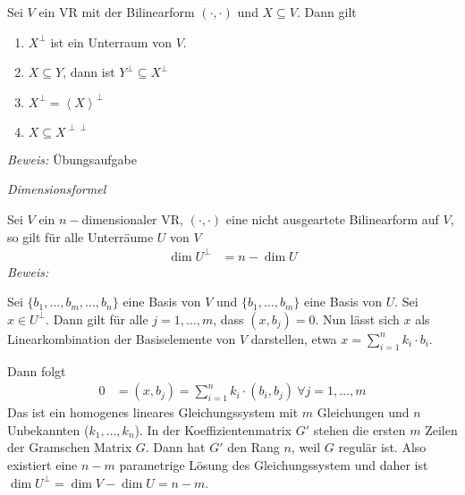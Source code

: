 
\begin{mysatz}\label{eigenschaftenorthKomplement}

Sei $V$ ein VR mit der Bilinearform $(\cdot , \cdot)$ und $X \subseteq V$.
Dann gilt
\begin{enumerate}
    \item $X^{\perp}$ ist ein Unterraum von $V$.
    \item $X \subseteq Y$, dann ist $Y^{\perp} \subseteq X^{\perp}$
    \item $X^{\perp} = \left\langle X \right\rangle^{\perp}$
    \item \label{EigOrthKompl4} $X \subseteq X^{\perp\perp}$
\end{enumerate}
\end{mysatz}
\textit{Beweis:} Übungsaufgabe


\begin{mylemma} \label{dimensionsformelorthKomplement} \textit{Dimensionsformel}

        Sei $V$ ein $n-$dimensionaler VR, $(\cdot , \cdot )$ eine nicht ausgeartete Bilinearform auf $V$, so gilt für alle Unterräume $U$ von $V$
        \begin{align*}
                \dim U^{\perp} & = n - \dim U
        \end{align*}
\textit{Beweis:}

        Sei $\{ b_1, \ldots, b_m, \ldots, b_n \}$ eine Basis von $V$ und $\{ b_1, \ldots, b_m \}$ eine Basis von $U$.
        Sei $x \in U^{\perp}$.
        Dann gilt für alle $j = 1, \ldots, m$, dass $(x, b_j) = 0$.
        Nun lässt sich $x$ als Linearkombination der Basiselemente von $V$ darstellen, etwa $\displaystyle{x=\sum_{i=1}^n k_i\cdot b_i}$.

        Dann folgt
        \begin{align*}
                0 & = (x, b_j) = \sum\limits_{i = 1}^n k_i \cdot (b_i, b_j) \ \forall j = 1, \ldots, m
        \end{align*}
        Das ist ein homogenes lineares Gleichungssystem mit $m$ Gleichungen und $n$ Unbekannten ($k_1, \ldots, k_n$).
        In der Koeffizientenmatrix $G'$ stehen die ersten $m$ Zeilen der Gramschen Matrix $G$.
        Dann hat $G'$ den Rang $n$, weil $G$ regulär ist.
        Also existiert eine $n-m$ parametrige Lösung des Gleichungssystem und daher ist $\dim U^{\perp} = \dim V - \dim U = n-m$.
\end{mylemma}

